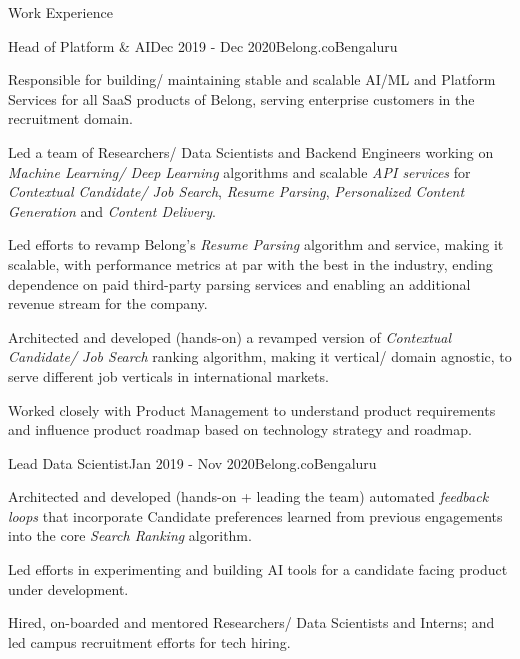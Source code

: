 \documentclass{resume} %
\begin{document}
\begin{rSection}{Work Experience}

\begin{rSubsection}{Head of Platform \& AI}{Dec 2019 - Dec 2020}{Belong.co}{Bengaluru}
\item Responsible for building/ maintaining stable and scalable AI/ML and Platform Services for all SaaS products of Belong, serving enterprise customers in the recruitment domain.
\item Led a team of Researchers/ Data Scientists and Backend Engineers working on {\em Machine Learning/ Deep Learning} algorithms and scalable {\em API services} for {\em Contextual Candidate/ Job Search}, {\em Resume Parsing}, {\em Personalized Content Generation} and {\em Content Delivery}.
\item Led efforts to revamp Belong's {\em Resume Parsing} algorithm and service, making it scalable, with performance metrics at par with the best in the industry, ending dependence on paid third-party parsing services and enabling an additional revenue stream for the company.
\item Architected and developed (hands-on) a revamped version of  {\em Contextual Candidate/ Job Search} ranking algorithm, making it vertical/ domain agnostic, to  serve different job verticals in international markets.
\item Worked closely with Product Management to understand product requirements and influence product roadmap based on technology strategy and roadmap.

\end{rSubsection}

\begin{rSubsection}{Lead Data Scientist}{Jan 2019 - Nov 2020}{Belong.co}{Bengaluru}
\item Architected and developed (hands-on + leading the team) automated {\em feedback loops} that incorporate Candidate preferences learned from previous engagements into the core {\em Search Ranking} algorithm.
\item Led efforts in experimenting and building AI tools for a candidate facing product under development. 
\item Hired, on-boarded and mentored Researchers/ Data Scientists and Interns; and led campus recruitment efforts for tech hiring.
\end{rSubsection}


\end{rSection}
\end{document}
